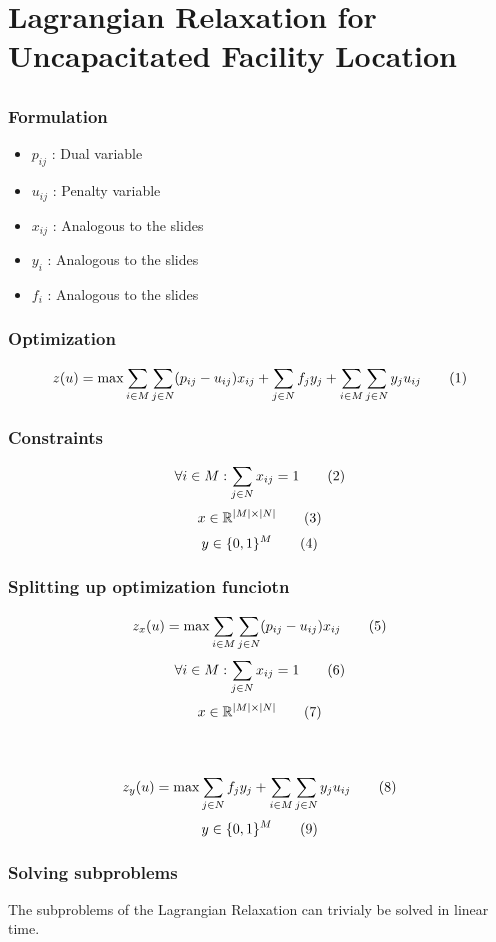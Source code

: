 \section{Lagrangian Relaxation for Uncapacitated Facility Location}

\subsection{ } 

\subsubsection{Formulation}

\begin{itemize}
	\item $p_{ij}$ : Dual variable
    \item $u_{ij}$ : Penalty variable
    \item $x_{ij}$ : Analogous to the slides
    \item $y_{i}$ : Analogous to the slides
	\item $f_i$ : Analogous to the slides
\end{itemize}

\subsubsection{Optimization}
\[ z(u) = \max\sum_{i \in M}\sum_{j \in N}(p_{ij} - u_{ij})x_{ij} + \sum_{j \in N}f_jy_j + \sum_{i \in M}\sum_{j \in N}y_{j}u_{ij} \addtag \]

\subsubsection{Constraints}

\[ \forall i \in M : \sum_{j \in N}x_{ij} = 1 \addtag \]
\[ x \in \mathbb{R}^{|M|\times|N|} \addtag \]
\[ y \in \{0,1\}^{M} \addtag \]

\subsubsection{Splitting up optimization funciotn}
\[ z_{x}(u) = \max\sum_{i \in M}\sum_{j \in N}(p_{ij} - u_{ij})x_{ij} \addtag \]
\[ \forall i \in M : \sum_{j \in N}x_{ij} = 1 \addtag \]
\[ x \in \mathbb{R}^{|M|\times|N|} \addtag \]
\\\\
\[ z_{y}(u) = \max\sum_{j \in N}f_jy_j + \sum_{i \in M}\sum_{j \in N}y_{j}u_{ij} \addtag \]
\[ y \in \{0,1\}^{M} \addtag \]

\subsubsection{Solving subproblems}
The subproblems of the Lagrangian Relaxation can trivialy be solved in linear time.
